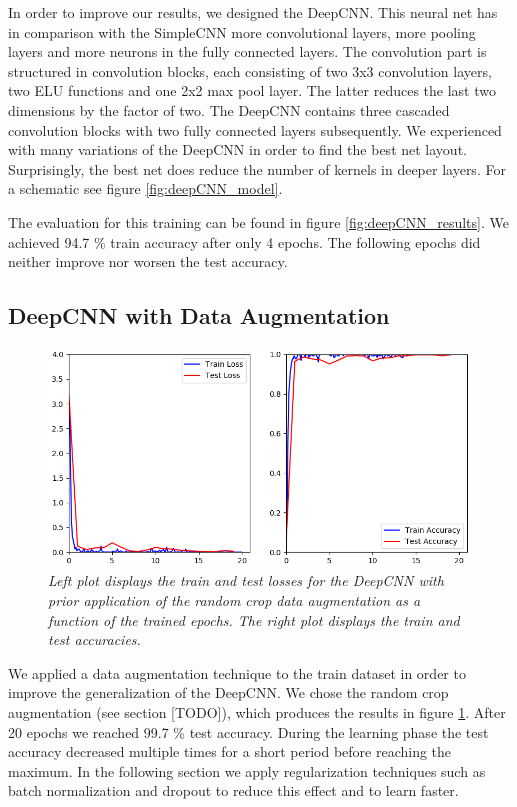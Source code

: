 \documentclass[a4paper]{article}
\begin{document}
In order to improve our results, we designed the DeepCNN. This neural net has in comparison with the SimpleCNN more convolutional layers, more pooling layers and more neurons in the fully connected layers. The convolution part is structured in convolution blocks, each consisting of two 3x3 convolution layers, two ELU functions and one 2x2 max pool layer. The latter reduces the last two dimensions by the factor of two. The DeepCNN contains three cascaded convolution blocks with two fully connected layers subsequently. We experienced with many variations of the DeepCNN in order to find the best net layout. Surprisingly, the best net does reduce the number of kernels in deeper layers. For a schematic see figure \ref{fig:deepCNN_model}. 

The evaluation for this training can be found in figure \ref{fig:deepCNN_results}. We achieved 94.7 \% train accuracy after only 4 epochs. The following epochs did neither improve nor worsen the test accuracy. 

\subsection{DeepCNN with Data Augmentation}\label{sec:deepCNN_augmented}

\begin{figure}
     \centering
     \includegraphics[height=0.25\paperwidth]{graphics/nets/CNN13_with_Augmentation_Results}
     \caption{\textit{Left plot displays the train and test losses for the DeepCNN with prior application of the random crop data augmentation as a function of the trained epochs. The right plot displays the train and test accuracies.}}
     \label{fig:deepCNN_augmented}
\end{figure}

We applied a data augmentation technique to the train dataset in order to improve the generalization of the DeepCNN. We chose the random crop augmentation (see section [TODO]), which produces the results in figure \ref{fig:deepCNN_augmented}. After 20 epochs we reached 99.7 \% test accuracy. During the learning phase the test accuracy decreased multiple times for a short period before reaching the maximum. In the following section we apply regularization techniques such as batch normalization and dropout to reduce this effect and to learn faster. 
\end{document}
